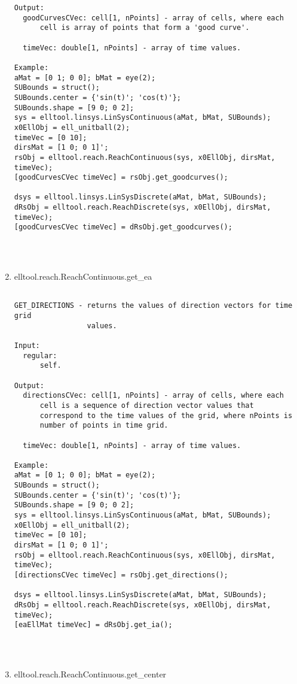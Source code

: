 \begin{enumerate}
\begin{lstlisting}
Output:
  goodCurvesCVec: cell[1, nPoints] - array of cells, where each
      cell is array of points that form a 'good curve'.

  timeVec: double[1, nPoints] - array of time values.

Example:
aMat = [0 1; 0 0]; bMat = eye(2);
SUBounds = struct();
SUBounds.center = {'sin(t)'; 'cos(t)'};
SUBounds.shape = [9 0; 0 2];
sys = elltool.linsys.LinSysContinuous(aMat, bMat, SUBounds);
x0EllObj = ell_unitball(2);
timeVec = [0 10];
dirsMat = [1 0; 0 1]';
rsObj = elltool.reach.ReachContinuous(sys, x0EllObj, dirsMat, timeVec);
[goodCurvesCVec timeVec] = rsObj.get_goodcurves();

dsys = elltool.linsys.LinSysDiscrete(aMat, bMat, SUBounds);
dRsObj = elltool.reach.ReachDiscrete(sys, x0EllObj, dirsMat, timeVec);
[goodCurvesCVec timeVec] = dRsObj.get_goodcurves();




\end{lstlisting}
\fontfamily{\familydefault}
\selectfont
\item {elltool.reach.ReachContinuous.get\_ea}
\selectfont
\begin{lstlisting}

GET_DIRECTIONS - returns the values of direction vectors for time grid
                 values.

Input:
  regular:
      self.

Output:
  directionsCVec: cell[1, nPoints] - array of cells, where each
      cell is a sequence of direction vector values that
      correspond to the time values of the grid, where nPoints is
      number of points in time grid.

  timeVec: double[1, nPoints] - array of time values.

Example:
aMat = [0 1; 0 0]; bMat = eye(2);
SUBounds = struct();
SUBounds.center = {'sin(t)'; 'cos(t)'};
SUBounds.shape = [9 0; 0 2];
sys = elltool.linsys.LinSysContinuous(aMat, bMat, SUBounds);
x0EllObj = ell_unitball(2);
timeVec = [0 10];
dirsMat = [1 0; 0 1]';
rsObj = elltool.reach.ReachContinuous(sys, x0EllObj, dirsMat, timeVec);
[directionsCVec timeVec] = rsObj.get_directions();

dsys = elltool.linsys.LinSysDiscrete(aMat, bMat, SUBounds);
dRsObj = elltool.reach.ReachDiscrete(sys, x0EllObj, dirsMat, timeVec);
[eaEllMat timeVec] = dRsObj.get_ia();




\end{lstlisting}
\fontfamily{\familydefault}
\selectfont
\item {elltool.reach.ReachContinuous.get\_center}
\selectfont
\begin{lstlisting}


\end{lstlisting}
\end{enumerate}

